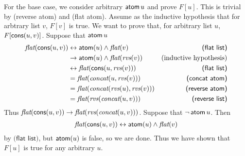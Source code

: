 \begin{exer}[4.1]
\begin{enumerate}[label=(\alph*)]
            For the base case, we consider arbitrary $\operatorname{\textsf{atom}} u$ and prove $F[u]$.
            This is trivial by \textsf{(reverse atom)} and \textsf{(flat atom)}.
            Assume as the inductive hypothesis that for arbtrary list $v$, $F[v]$ is true.
            We want to prove that, for arbitrary list $u$, $F[\operatorname{\textsf{cons}}(u, v)]$.
            Suppose that $\operatorname{\textsf{atom}} u$
            \begin{align*}
                \operatorname{\textit{flat}}(\operatorname{\textsf{cons}}(u, v))
                    &\leftrightarrow \operatorname{\textsf{atom}}(u) \land \operatorname{\textit{flat}}(v) & \textsf{(flat list)}\\
                    &\rightarrow \operatorname{\textsf{atom}}(u) \land \operatorname{\textit{flat}}(\operatorname{\textit{rvs}}(v)) & \text{(inductive hypothesis)}\\
                    &\leftrightarrow \operatorname{\textit{flat}}(\operatorname{\textsf{cons}}(u, \operatorname{\textit{rvs}}(v))) & \textsf{(flat list)} \\
                    &= \operatorname{\textit{flat}}(\operatorname{\textit{concat}}(u, \operatorname{\textit{rvs}}(v))) & \textsf{(concat atom)} \\
                    &= \operatorname{\textit{flat}}(\operatorname{\textit{concat}}(\operatorname{\textit{rvs}}(u), \operatorname{\textit{rvs}}(v))) & \textsf{(reverse atom)} \\
                    &= \operatorname{\textit{flat}}(\operatorname{\textit{rvs}}(\operatorname{\textit{concat}}(u, v))) & \textsf{(reverse list)} \\
            \end{align*}
            Thus $\operatorname{\textit{flat}}(\operatorname{\textsf{cons}}(u, v)) \rightarrow \operatorname{\textit{flat}}(\operatorname{\textit{rvs}}(\operatorname{\textit{concat}}(u, v)))$.
            Suppose that $\neg\operatorname{\textsf{atom}} u$.
            Then
            \begin{align*}
                \operatorname{\textit{flat}}(\operatorname{\textsf{cons}}(u, v)) \leftrightarrow \operatorname{\textsf{atom}}(u) \land \operatorname{\textit{flat}}(v)
            \end{align*}
            by $\textsf{(flat list)}$, but $\operatorname{\textsf{atom}}(u)$ is false, so we are done.
            Thus we have shown that $F[u]$ is true for any arbitrary $u$.
    \end{enumerate}
\end{exer}
